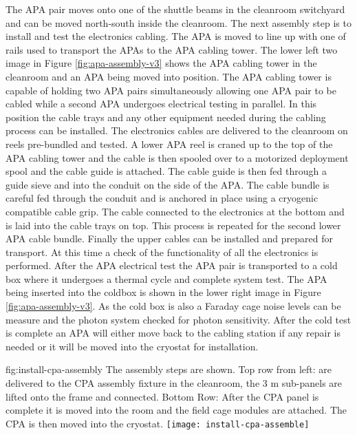 The APA pair moves onto one of the shuttle beams in the cleanroom switchyard and can be moved north-south inside the cleanroom. The next assembly step is to install and test the electronics cabling. The APA is moved to line up with one of rails used to transport the APAs to the APA cabling tower. The lower left two image in Figure \ref{fig:apa-assembly-v3} shows the APA cabling tower in the cleanroom and an APA being moved into position. The APA cabling tower is capable of holding two APA pairs simultaneously allowing one APA pair to be cabled while a second APA undergoes electrical testing in parallel. In this position the cable trays and any other equipment needed during the cabling process can be installed. The electronics cables are delivered to the cleanroom on reels pre-bundled and tested. A lower APA reel is craned up to the top of the APA cabling tower and the cable is then spooled over to a motorized deployment spool and the cable guide is attached. The cable guide is then fed through a guide sieve and into the conduit on the side of the APA. The cable bundle is careful fed through the conduit and is anchored in place using a cryogenic compatible cable grip. The cable connected to the electronics at the bottom and is laid into the cable trays on top. This process is repeated for the second lower APA cable bundle. Finally the upper cables can be installed and prepared for transport. At this time a check of the functionality of all the electronics is performed. After the APA electrical test the APA pair is transported to a cold box where it undergoes a thermal cycle and complete system test. The APA being inserted into the coldbox is shown in the lower right image in Figure \ref{fig:apa-assembly-v3}. As the cold box is also a Faraday cage noise levels can be measure and the photon system checked for photon sensitivity. After the cold test is complete an APA will either move back to the cabling station if any repair is needed or it will be moved into the cryostat for installation. 



\begin{dunefigure}{fig:install-cpa-assembly}
  {The  assembly steps are shown. Top row from left:   are delivered to the CPA assembly fixture in the cleanroom, the 3 \si{m} sub-panels are lifted onto the frame and connected. Bottom Row: After the CPA panel is complete it is moved into the room and the field cage modules are attached. The CPA is then moved into the cryostat.}
\texttt{[image: install-cpa-assemble]}
\end{dunefigure}

